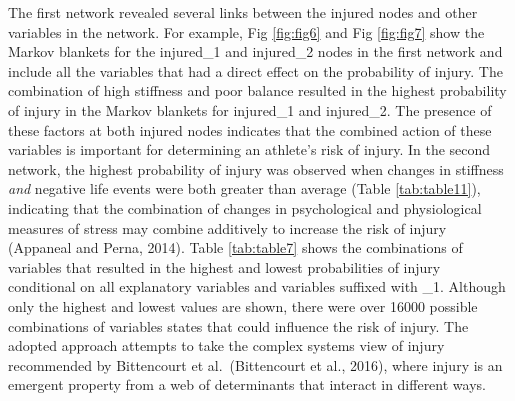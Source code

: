 \documentclass[
]{frontiersHLTH}
\begin{document}
The first network revealed several links between the injured nodes and
other variables in the network. For example, Fig \ref{fig:fig6} and Fig
\ref{fig:fig7} show the Markov blankets for the injured\_1 and
injured\_2 nodes in the first network and include all the variables that
had a direct effect on the probability of injury. The combination of
high stiffness and poor balance resulted in the highest probability of
injury in the Markov blankets for injured\_1 and injured\_2. The
presence of these factors at both injured nodes indicates that the
combined action of these variables is important for determining an
athlete's risk of injury. In the second network, the highest probability
of injury was observed when changes in stiffness \emph{and} negative
life events were both greater than average (Table \ref{tab:table11}),
indicating that the combination of changes in psychological and
physiological measures of stress may combine additively to increase the
risk of injury (Appaneal and Perna, 2014). Table \ref{tab:table7} shows
the combinations of variables that resulted in the highest and lowest
probabilities of injury conditional on all explanatory variables and
variables suffixed with \_1. Although only the highest and lowest values
are shown, there were over 16000 possible combinations of variables
states that could influence the risk of injury. The adopted approach
attempts to take the complex systems view of injury recommended by
Bittencourt et al.~(Bittencourt et al., 2016), where injury is an
emergent property from a web of determinants that interact in different
ways.
\end{document}

